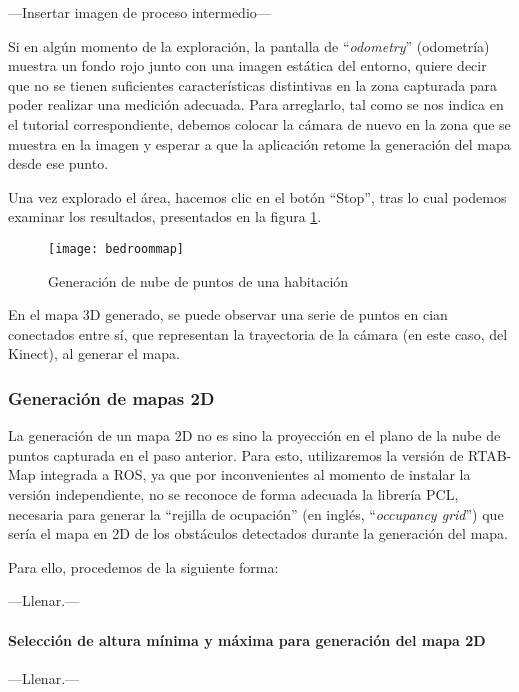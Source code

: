 ---Insertar imagen de proceso intermedio---

Si en algún momento de la exploración, la pantalla de ``\textit{odometry}'' (odometría) muestra un fondo rojo junto con una imagen estática del entorno, quiere decir que no se tienen suficientes características distintivas en la zona capturada para poder realizar una medición adecuada. Para arreglarlo, tal como se nos indica en el tutorial correspondiente, debemos colocar la cámara de nuevo en la zona que se muestra en la imagen y esperar a que la aplicación retome la generación del mapa desde ese punto.

Una vez explorado el área, hacemos clic en el botón ``Stop'', tras lo cual podemos examinar los resultados, presentados en la figura \ref{figure:bedroommap}.

\begin{figure}[hb]
\centering
\texttt{[image: bedroommap]}
\caption{Generación de nube de puntos de una habitación}
\label{figure:bedroommap}
\end{figure}

En el mapa 3D generado, se puede observar una serie de puntos en cian conectados entre sí, que representan la trayectoria de la cámara (en este caso, del Kinect), al generar el mapa.

\subsubsection{Generación de mapas 2D}

La generación de un mapa 2D no es sino la proyección en el plano de la nube de puntos capturada en el paso anterior. Para esto, utilizaremos la versión de RTAB-Map integrada a ROS, ya que por inconvenientes al momento de instalar la versión independiente, no se reconoce de forma adecuada la librería PCL, necesaria para generar la ``rejilla de ocupación'' (en inglés, ``\textit{occupancy grid}'') que sería el mapa en 2D de los obstáculos detectados durante la generación del mapa.

Para ello, procedemos de la siguiente forma:

---Llenar.---

\paragraph{Selección de altura mínima y máxima para generación del mapa 2D}

---Llenar.---